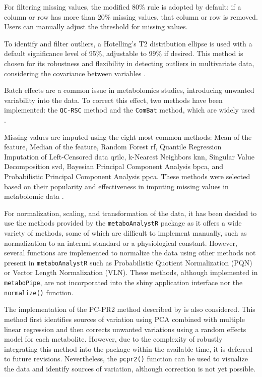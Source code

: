 \documentclass[ENG, BIB]{TFUOC}%
\begin{document}
For filtering missing values, the modified 80\% rule is adopted by default: if a column or row has more than 20\% missing values, that column or row is removed. Users can manually adjust the threshold for missing values.

To identify and filter outliers, a Hotelling's T2 distribution ellipse is used with a default significance level of 95\%, adjustable to 99\% if desired. This method is chosen for its robustness and flexibility in detecting outliers in multivariate data, considering the covariance between variables \cite{wuUsingNontargetedLCMS2021, viallonNewPipelineNormalization2021}.

Batch effects are a common issue in metabolomics studies, introducing unwanted variability into the data. To correct this effect, two methods have been implemented: the \texttt{QC-RSC} method and the \texttt{ComBat} method, which are widely used .

Missing values are imputed using the eight most common methods: Mean of the feature, Median of the feature, Random Forest \gls{rf}, Quantile Regression Imputation of Left-Censored data \gls{qrilc}, k-Nearest Neighbors \gls{knn}, Singular Value Decomposition \gls{svd}, Bayesian Principal Component Analysis \gls{bpca}, and Probabilistic Principal Component Analysis \gls{ppca}. These methods were selected based on their popularity and effectiveness in imputing missing values in metabolomic data \cite{weiMissingValueImputation2018,sunPretreatingNormalizingMetabolomics2024}.

For normalization, scaling, and transformation of the data, it has been decided to use the methods provided by the \texttt{metaboAnalystR} package as it offers a wide variety of methods, some of which are difficult to implement manually, such as normalization to an internal standard or a physiological constant. However, several functions are implemented to normalize the data using other methods not present in \texttt{metaboAnalystR} such as Probabilistic Quotient Normalization (PQN) or Vector Length Normalization (VLN). These methods, although implemented in \texttt{metaboPipe}, are not incorporated into the shiny application interface nor the \texttt{normalize()} function.

The implementation of the PC-PR2 method described by \citeauthor{viallonNewPipelineNormalization2021} is also considered. This method first identifies sources of variation using PCA combined with multiple linear regression and then corrects unwanted variations using a random effects model for each metabolite. However, due to the complexity of robustly integrating this method into the package within the available time, it is deferred to future revisions. Nevertheless, the \texttt{pcpr2()} function can be used to visualize the data and identify sources of variation, although correction is not yet possible.
\end{document}
